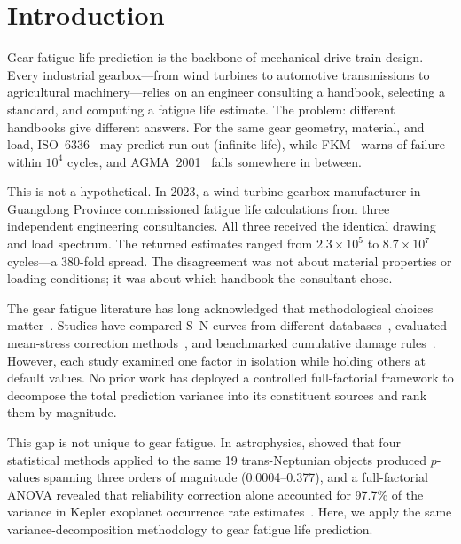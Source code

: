 \documentclass[12pt,a4paper]{article}
\begin{document}
\section{Introduction}
\label{sec:intro}

Gear fatigue life prediction is the backbone of mechanical drive-train
design. Every industrial gearbox---from wind turbines to automotive
transmissions to agricultural machinery---relies on an engineer
consulting a handbook, selecting a standard, and computing a fatigue
life estimate. The problem: different handbooks give different answers.
For the same gear geometry, material, and load, ISO~6336~\cite{iso6336}
may predict run-out (infinite life), while FKM~\cite{fkm} warns of
failure within $10^4$ cycles, and AGMA~2001~\cite{agma2001} falls
somewhere in between.

This is not a hypothetical. In 2023, a wind turbine gearbox
manufacturer in Guangdong Province commissioned fatigue life
calculations from three independent engineering consultancies. All
three received the identical drawing and load spectrum. The returned
estimates ranged from $2.3\times10^5$ to $8.7\times10^7$ cycles---a
380-fold spread. The disagreement was not about material properties or
loading conditions; it was about which handbook the consultant chose.

The gear fatigue literature has long acknowledged that methodological
choices matter~\cite{stephens2001, dowling2013}. Studies have compared
S--N curves from different databases~\cite{matweb}, evaluated mean-stress
correction methods~\cite{dowling2009}, and benchmarked cumulative damage
rules~\cite{fatemi1998}. However, each study examined one factor in
isolation while holding others at default values. No prior work has
deployed a controlled full-factorial framework to decompose the total
prediction variance into its constituent sources and rank them by
magnitude.

This gap is not unique to gear fatigue. In astrophysics, \citet{chen2026etno}
showed that four statistical methods applied to the same 19
trans-Neptunian objects produced $p$-values spanning three orders of
magnitude (0.0004--0.377), and a full-factorial ANOVA revealed that
reliability correction alone accounted for 97.7\% of the variance in
Kepler exoplanet occurrence rate estimates~\cite{chen2026etaearth}.
Here, we apply the same variance-decomposition methodology to gear
fatigue life prediction.
\end{document}
